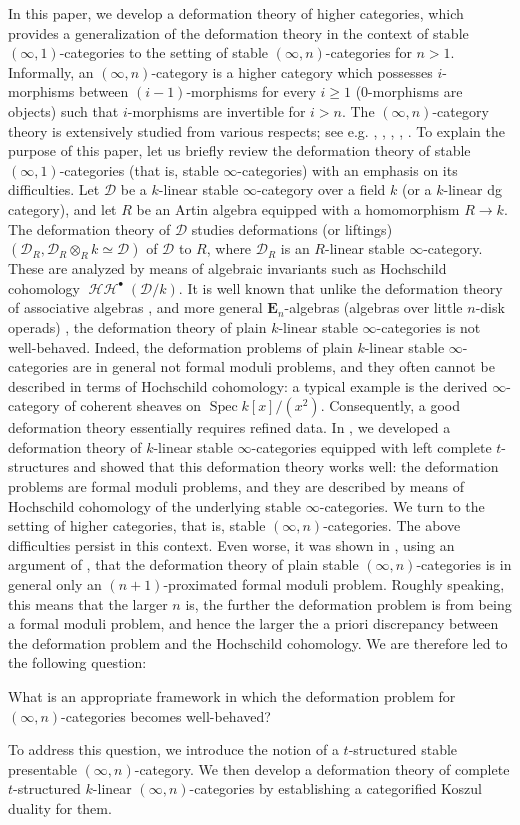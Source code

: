\documentclass[leqno,12pt]{amsart}
\theoremstyle{plain}
\theoremstyle{definition}
\newcommand{\HH}{\operatorname{\mathcal{HH}}}
\newcommand{\DDD}{\mathcal{D}}
\newcommand{\Spec}{\operatorname{Spec}}
\begin{document}
In this paper, we develop a deformation theory of higher categories, which provides a generalization
of the deformation theory in the context of stable $(\infty,1)$-categories to the setting of stable $(\infty,n)$-categories for $n>1$.
Informally, 
an $(\infty,n)$-category is a higher category which possesses 
$i$-morphisms between $(i-1)$-morphisms for every $i\ge1$
($0$-morphisms are objects)
such that $i$-morphisms are invertible for $i> n$. The $(\infty,n)$-category theory is extensively studied from various respects; see e.g. \cite{BSP}, \cite{GH}, \cite{JFS}, \cite{Lu}, \cite{Si}.
To explain the purpose of this paper, let us briefly review the deformation theory of stable $(\infty,1)$-categories (that is, stable $\infty$-categories) with an emphasis on its difficulties.
Let $\DDD$ be a $k$-linear stable $\infty$-category over a field $k$ (or a $k$-linear dg category), and let $R$ be an Artin algebra equipped with a homomorphism $R\to k$. 
The deformation theory of $\DDD$ studies deformations (or liftings) $(\DDD_R,\DDD_R\otimes_Rk\simeq \DDD)$ of $\DDD$ to $R$, where $\DDD_R$ is an $R$-linear stable $\infty$-category.
These are analyzed
by means of algebraic invariants such as Hochschild cohomology $\HH^\bullet(\DDD/k)$.
It is well known that unlike the deformation theory of associative algebras \cite{Ger1}, \cite{Ger2} and more general $\mathbf{E}_{n}$-algebras (algebras over little $n$-disk operads) \cite{FR}, the deformation theory of plain $k$-linear stable $\infty$-categories is not well-behaved.
Indeed, the deformation problems of plain $k$-linear stable $\infty$-categories are in general not formal moduli problems, and
they often cannot be described in terms of Hochschild cohomology: a typical example is the derived $\infty$-category of coherent sheaves on $\Spec k[x]/(x^2)$.
Consequently, a good deformation theory essentially requires refined data.
In \cite{IH}, we developed a deformation theory of $k$-linear stable $\infty$-categories equipped with left complete $t$-structures
and showed that this deformation theory works well: the deformation problems are formal moduli problems, and they are described by means of Hochschild
cohomology of the underlying stable $\infty$-categories.
We turn to the setting of higher categories, that is, stable $(\infty,n)$-categories.
The above difficulties persist in this context. Even worse, it was shown in \cite{Ch}, using an argument of \cite[X]{DAG},
that the deformation theory of plain stable $(\infty,n)$-categories is in general only an $(n+1)$-proximated formal moduli problem.
Roughly speaking, this means that the larger $n$ is, the further the deformation problem is from being a formal moduli problem, and hence the larger the a priori discrepancy between the deformation problem and the Hochschild cohomology.
We are therefore led to the following question:
\begin{center}
What is an appropriate framework in which the deformation problem for $(\infty,n)$-categories becomes well-behaved?
\end{center}
To address this question,
we introduce the notion of a $t$-structured stable presentable $(\infty,n)$-category. We then develop a deformation theory of complete $t$-structured $k$-linear $(\infty,n)$-categories by establishing a categorified Koszul duality for them.
\end{document}
